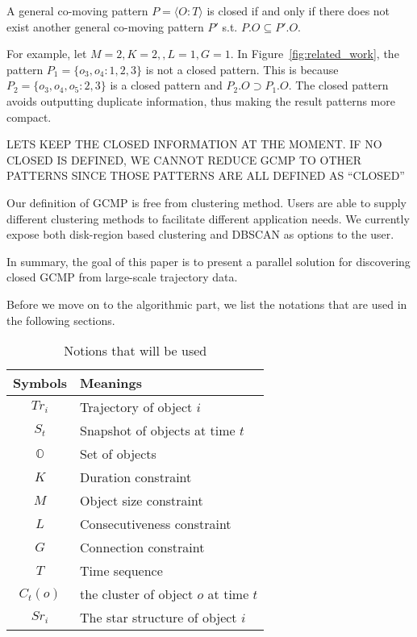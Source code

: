 \begin{definition}
A general co-moving pattern $P=\langle O:T \rangle$ is closed if and only if there does not exist another general co-moving pattern $P'$ s.t. $P.O \subseteq P'.O$.
\end{definition}

For example, let $M=2,K=2,,L=1,G=1$. In Figure~\ref{fig:related_work},
the pattern $P_1 = \{o_3,o_4:1,2,3\}$ is not a closed pattern. This is because $P_2=\{o_3,o_4,o_5:2,3\}$ is a closed pattern and $P_2.O \supset P_1.O$. The closed pattern avoids outputting duplicate information, thus making the result patterns more compact. 

LETS KEEP THE CLOSED INFORMATION AT THE MOMENT. IF NO CLOSED IS DEFINED, WE CANNOT REDUCE GCMP TO OTHER PATTERNS SINCE THOSE PATTERNS ARE ALL DEFINED AS ``CLOSED''

Our definition of GCMP is free from clustering method. Users are able to supply different clustering methods to facilitate different application needs. 
We currently expose both disk-region based clustering and DBSCAN as options to the user.

In summary, the goal of this paper is to present a parallel solution for discovering closed GCMP from large-scale trajectory data.

Before we move on to the algorithmic part, we list the notations that are used in the following sections.

\begin{table}[h]
\centering
\begin{tabular}{|c|l|} 
\hline
Symbols & Meanings \\
\hline 
$Tr_i$ & Trajectory of object $i$\\ 
\hline
$S_t$ & Snapshot of objects at time $t$ \\
\hline 
$\mathbb{O}$ & Set of objects \\ 
\hline 
$K$ & Duration constraint\\
\hline
$M$ & Object size constraint \\
\hline
$L$ & Consecutiveness constraint\\
\hline
$G$ & Connection constraint \\
\hline
$T$ & Time sequence \\
\hline
$C_t(o)$ & the cluster of object $o$ at time $t$ \\
\hline 
$Sr_i $ &  The star structure of object $i$ \\
\hline 
\end{tabular} 
\caption{Notions that will be used}
\end{table}